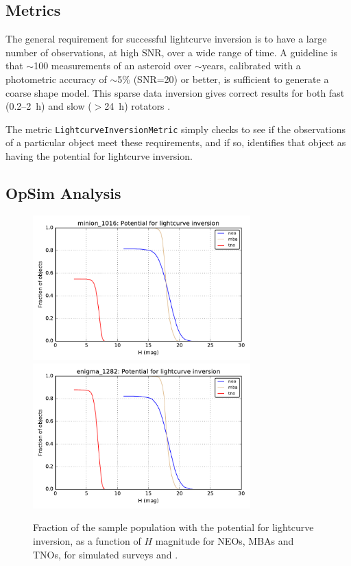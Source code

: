 
\subsection{Metrics}
\label{sec:\secname:metrics}

The general requirement for successful lightcurve inversion is to have
a large number of observations, at high SNR, over a wide range of
time. A guideline is that $\sim$100 measurements of an asteroid over
$\sim$years, calibrated with a photometric accuracy of
$\sim$5\% (SNR=20) or better, is sufficient to generate a coarse shape model.
This sparse data inversion gives correct results for both fast (0.2--2~h) and
slow ($>$24~h) rotators \citep{2007IAUS..236..191D}.

The metric {\tt LightcurveInversionMetric} simply checks to see if the
observations of a particular object meet these requirements, and if
so, identifies that object as having the potential for lightcurve
inversion.


\subsection{OpSim Analysis}
\label{sec:\secname:analysis}

\begin{figure}
\includegraphics[width=3.3in]{figs/solarsystem/minion_1016_LightcurveInversion_neo_tno_mba_MOOB_ComboMetricVsH}
\includegraphics[width=3.3in]{figs/solarsystem/enigma_1282_LightcurveInversion_neo_tno_mba_MOOB_ComboMetricVsH}
\caption{Fraction of the sample population with the potential for
  lightcurve inversion, as a function of $H$ magnitude for NEOs, MBAs
  and TNOs, for simulated surveys  and .
\label{lightcurveinversion}}
\end{figure}

